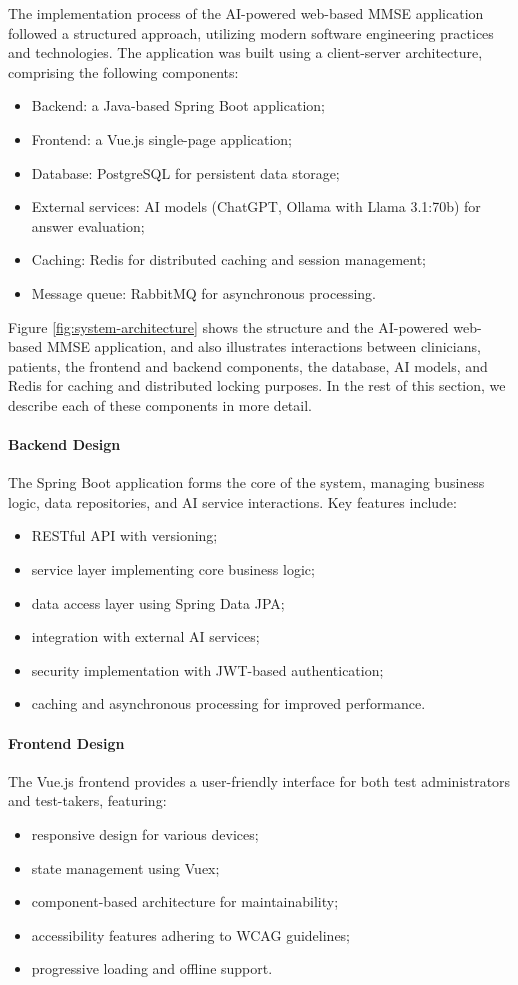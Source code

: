 The implementation process of the AI-powered web-based MMSE application followed a structured approach, utilizing modern software engineering practices and technologies. The application was built using a client-server architecture, comprising the following components:
\begin{itemize}
\item Backend: a Java-based Spring Boot application;
\item Frontend: a Vue.js single-page application;
\item Database: PostgreSQL for persistent data storage;
\item External services: AI models (ChatGPT, Ollama with Llama 3.1:70b) for answer evaluation;
\item Caching: Redis for distributed caching and session management;
\item Message queue: RabbitMQ for asynchronous processing.
\end{itemize}

Figure \ref{fig:system-architecture} shows the structure and the AI-powered web-based MMSE application, and also illustrates interactions between clinicians, patients, the frontend and backend components, the database, AI models, and Redis for caching and distributed locking purposes. In the rest of this section, we describe each of these components in more detail.

\paragraph{Backend Design}
The Spring Boot application forms the core of the system, managing business logic, data repositories, and AI service interactions. Key features include:
\begin{itemize}
\item RESTful API with versioning;
\item service layer implementing core business logic;
\item data access layer using Spring Data JPA;
\item integration with external AI services;
\item security implementation with JWT-based authentication;
\item caching and asynchronous processing for improved performance.
\end{itemize}

\paragraph{Frontend Design}
The Vue.js frontend provides a user-friendly interface for both test administrators and test-takers, featuring:
\begin{itemize}
\item responsive design for various devices;
\item state management using Vuex;
\item component-based architecture for maintainability;
\item accessibility features adhering to WCAG guidelines;
\item progressive loading and offline support.
\end{itemize}

